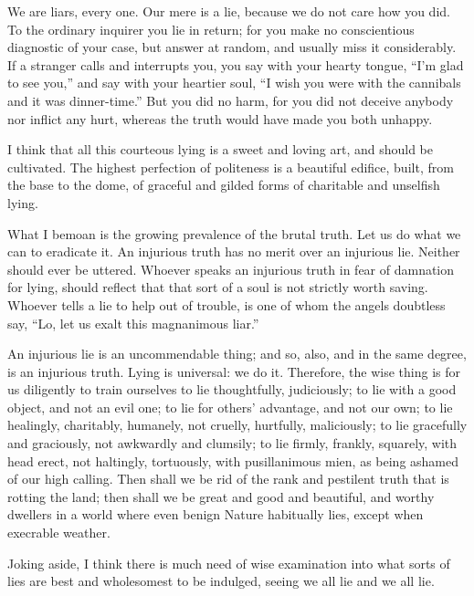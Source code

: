 \documentclass[../interior-demo.tex]{subfiles}
\begin{document}
We are liars, every one. Our mere 
is a lie, because we do not care how you did.
To the ordinary inquirer you lie in return; for you make
no conscientious diagnostic of your case, but answer at random, and
usually miss it considerably. If a stranger calls and interrupts
you, you say with your hearty tongue, ``I'm glad to see you,'' and say
with your heartier soul, ``I wish you were with the cannibals and it was
dinner-time.'' But you did no harm, for you did not
deceive anybody nor inflict any hurt, whereas the truth would have made
you both unhappy.

I think that all this courteous lying is a sweet and loving art, and
should be cultivated. The highest perfection of politeness is
a beautiful edifice, built, from the base to the dome, of graceful and
gilded forms of charitable and unselfish lying.

What I bemoan is the growing prevalence of the brutal truth. Let us do
what we can to eradicate it. An injurious truth has no merit over an
injurious lie. Neither should ever be uttered. Whoever speaks an
injurious truth in fear of damnation for lying, should
reflect that that sort of a soul is not strictly worth saving.
Whoever tells a lie to help  out of trouble,
is one of whom the angels doubtless say, ``Lo, let us exalt this
magnanimous liar.''

An injurious lie is an uncommendable thing; and so, also, and in the same
degree, is an injurious truth. Lying is universal: we  do it.
Therefore, the wise thing is for us
diligently to train ourselves to lie thoughtfully, judiciously; to lie
with a good object, and not an evil one; to lie for others' advantage,
and not our own; to lie healingly, charitably, humanely, not cruelly,
hurtfully, maliciously; to lie gracefully and graciously, not awkwardly
and clumsily; to lie firmly, frankly, squarely, with head erect, not
haltingly, tortuously, with pusillanimous mien, as being ashamed of our
high calling. Then shall we be rid of the rank and pestilent truth that
is rotting the land; then shall we be great and good and beautiful, and
worthy dwellers in a world where even benign Nature habitually lies,
except when execrable weather.

Joking aside, I think there is much need of wise examination into what
sorts of lies are best and wholesomest to be indulged, seeing we 
all lie and we  all lie.
\end{document}
